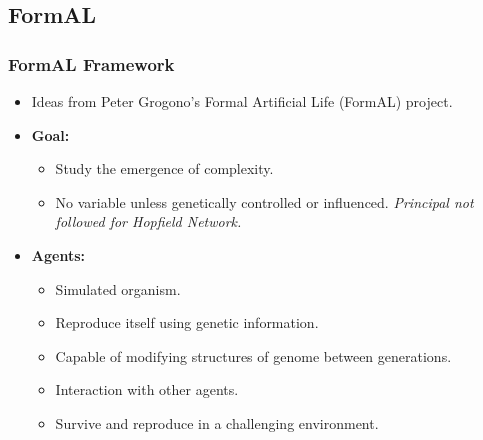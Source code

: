\subsection{FormAL}

\frame
{
	\frametitle{FormAL Framework}
	
	\begin{itemize}
		\item Ideas from Peter Grogono's Formal Artificial Life (FormAL) project.
		\item \textbf{Goal:}		
			\begin{itemize}
				\item Study the emergence of complexity.
				\item No variable unless genetically controlled or influenced. \textit{Principal not followed for Hopfield Network.}
			\end{itemize}
		\item \textbf{Agents:}
			\begin{itemize}
				\item Simulated organism.
				\item Reproduce itself using genetic information.
				\item Capable of modifying structures of genome between generations.
				\item Interaction with other agents.
				\item Survive and reproduce in a challenging environment.
			\end{itemize}
	\end{itemize}
	
}

